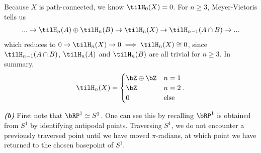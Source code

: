 \begin{homework}[e]
\begin{prf}
    Because $X$ is path-connected, we know $\tilH_0(X) = 0$. For $n \geq 3$, Meyer-Vietoris tells us
    \begin{align*}
      ... \to \tilH_n(A) \oplus \tilH_n(B) \to \tilH_n(X) \to \tilH_{n-1}(A\cap B) \to ...
    \end{align*}
    which reduces to $0 \to \tilH_n(X) \to 0\implies \tilH_n(X) \cong 0$, since $\tilH_{n-1}(A\cap B)$, $\tilH_n(A)$ and $\tilH_n(B)$ are all trivial for $n \geq 3$. In summary,
    \begin{align*}
      \tilH_n(X) = 
      \begin{cases}
        \bZ \oplus \bZ & n = 1 \\
        \bZ & n = 2 \\
        0 & \text{else}
      \end{cases}.
    \end{align*}
    \bigskip

    \noindent \textbf{\emph{(b)}}\hspace{1em} First note that $\bRP^1 \simeq S^1$. One can see this by recalling $\bRP^1$ is obtained from $S^1$ by identifying antipodal points. Traversing $S^1$, we do not encounter a previously traversed point until we have moved $\pi$-radians, at which point we have returned to the chosen basepoint of $S^1$.


\end{prf}
\end{homework}
